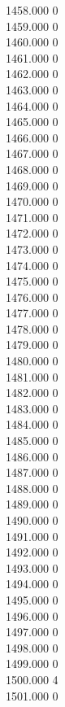 { 1458.000	0 \\
 1459.000	0 \\
 1460.000	0 \\
 1461.000	0 \\
 1462.000	0 \\
 1463.000	0 \\
 1464.000	0 \\
 1465.000	0 \\
 1466.000	0 \\
 1467.000	0 \\
 1468.000	0 \\
 1469.000	0 \\
 1470.000	0 \\
 1471.000	0 \\
 1472.000	0 \\
 1473.000	0 \\
 1474.000	0 \\
 1475.000	0 \\
 1476.000	0 \\
 1477.000	0 \\
 1478.000	0 \\
 1479.000	0 \\
 1480.000	0 \\
 1481.000	0 \\
 1482.000	0 \\
 1483.000	0 \\
 1484.000	0 \\
 1485.000	0 \\
 1486.000	0 \\
 1487.000	0 \\
 1488.000	0 \\
 1489.000	0 \\
 1490.000	0 \\
 1491.000	0 \\
 1492.000	0 \\
 1493.000	0 \\
 1494.000	0 \\
 1495.000	0 \\
 1496.000	0 \\
 1497.000	0 \\
 1498.000	0 \\
 1499.000	0 \\
 1500.000	4 \\
 1501.000	0 \\
}

